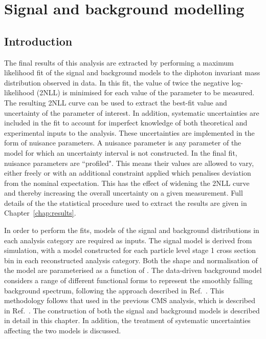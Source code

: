 \chapter{Signal and background modelling}
\label{chap:sigbkg}

\section{Introduction}

The final results of this analysis are extracted by performing a maximum likelihood fit 
of the signal and background models to the diphoton invariant mass distribution observed in data.
In this fit, the value of twice the negative log-likelihood (2NLL) is minimised 
for each value of the parameter to be measured.
The resulting 2NLL curve can be used to extract the best-fit value and uncertainty 
of the parameter of interest.
In addition, systematic uncertainties are included in the fit to account for 
imperfect knowledge of both theoretical and experimental inputs to the analysis.
These uncertainties are implemented in the form of nuisance parameters.
A nuisance parameter is any parameter of the model for which 
an uncertainty interval is not constructed.
In the final fit, nuisance parameters are ``profiled".
This means their values are allowed to vary, 
either freely or with an additional constraint applied 
which penalises deviation from the nominal expectation.
This has the effect of widening the 2NLL curve and thereby increasing the overall uncertainty
on a given measurement.
Full details of the the statistical procedure used to extract the results 
are given in Chapter~\ref{chap:results}.

In order to perform the fits, models of the signal and background \mgg distributions 
in each analysis category are required as inputs.
The signal model is derived from simulation, 
with a model constructed for each particle level stage 1 cross section bin 
in each reconstructed analysis category.
Both the shape and normalisation of the model are parameterised as a function of \mH.
The data-driven background model considers a range of different functional forms to 
represent the smoothly falling background spectrum, 
following the approach described in Ref.~\cite{Envelope}.
This methodology follows that used in the previous CMS \Hgg analysis, 
which is described in Ref.~\cite{HIG-16-040}.
The construction of both the signal and background models is described in detail in this chapter.
In addition, the treatment of systematic uncertainties affecting the two models is discussed.

